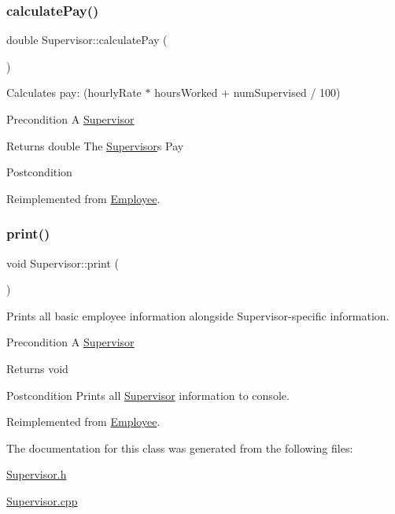 \subsubsection{\texorpdfstring{calculate\+Pay()}{calculatePay()}}
{\footnotesize\ttfamily double Supervisor\+::calculate\+Pay (\begin{DoxyParamCaption}{ }\end{DoxyParamCaption})\hspace{0.3cm}{\ttfamily [virtual]}}

Calculates pay\+: (hourly\+Rate $\ast$ hours\+Worked + num\+Supervised / 100)

\begin{DoxyPrecond}{Precondition}
A \hyperlink{classSupervisor}{Supervisor} 
\end{DoxyPrecond}
\begin{DoxyReturn}{Returns}
double The \hyperlink{classSupervisor}{Supervisor}\textquotesingle{}s Pay 
\end{DoxyReturn}
\begin{DoxyPostcond}{Postcondition}

\end{DoxyPostcond}


Reimplemented from \hyperlink{classEmployee_a01c2c44e15434237db28832f6972e960}{Employee}.

\mbox{\label{classSupervisor_a92483dc9a54904d79b46c6ec4efb3f54}} 
\subsubsection{\texorpdfstring{print()}{print()}}
{\footnotesize\ttfamily void Supervisor\+::print (\begin{DoxyParamCaption}{ }\end{DoxyParamCaption})\hspace{0.3cm}{\ttfamily [virtual]}}

Prints all basic employee information alongside Supervisor-\/specific information.

\begin{DoxyPrecond}{Precondition}
A \hyperlink{classSupervisor}{Supervisor} 
\end{DoxyPrecond}
\begin{DoxyReturn}{Returns}
void 
\end{DoxyReturn}
\begin{DoxyPostcond}{Postcondition}
Prints all \hyperlink{classSupervisor}{Supervisor} information to console. 
\end{DoxyPostcond}


Reimplemented from \hyperlink{classEmployee_a79556ad700627dba88049f487a34a762}{Employee}.



The documentation for this class was generated from the following files\+:\begin{DoxyCompactItemize}
\item 
\hyperlink{Supervisor_8h}{Supervisor.\+h}\item 
\hyperlink{Supervisor_8cpp}{Supervisor.\+cpp}\end{DoxyCompactItemize}
